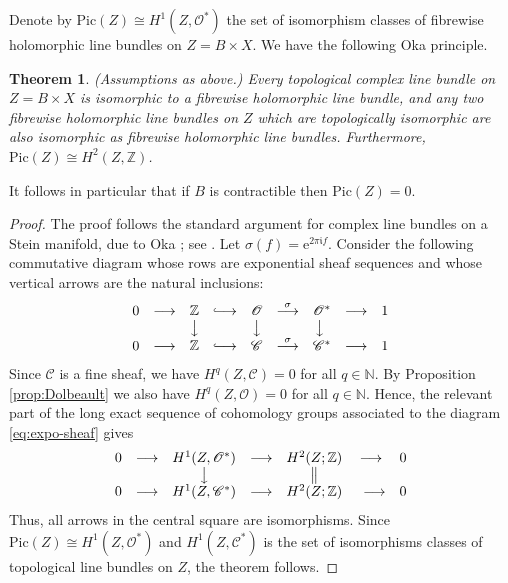 \documentclass[11pt]{amsart}
\numberwithin{equation}{section}
\newtheorem{theorem}{Theorem}[section]
\theoremstyle{definition}
\newcommand\Cscr{\mathscr{C}}
\newcommand\Oscr{\mathscr{O}}
\newcommand\N{\mathbb{N}}
\newcommand\Z{\mathbb{Z}}
\newcommand\igot{\mathfrak{i}}
\renewcommand\igot{\mathfrak{i}}
\newcommand\E{\mathrm{e}}
\newcommand\I{\imath}
\renewcommand\imath{\igot}
\newcommand\lra{\longrightarrow}
\newcommand\longhookrightarrow{\ensuremath{\lhook\joinrel\relbar\joinrel\rightarrow}}
\newcommand\Pic{\mathrm{Pic}}
\begin{document}
Denote by $\Pic(Z)\cong H^1(Z,\Oscr^*)$ the set of isomorphism 
classes of fibrewise holomorphic line bundles on $Z=B\times X$. 
We have the following Oka principle.

%
%
\begin{theorem}\label{th:OPLB}
(Assumptions as above.) 
Every topological complex line bundle on $Z=B\times X$ 
is isomorphic to a fibrewise holomorphic line bundle, 
and any two fibrewise holomorphic line bundles on $Z$
which are topologically isomorphic are also
isomorphic as fibrewise holomorphic line bundles.
Furthermore, $\Pic(Z)\cong H^2(Z,\Z)$.
\end{theorem} 

It follows in particular that if $B$ is contractible then $\Pic(Z)=0$.

\begin{proof}
The proof follows the standard argument for complex line
bundles on a Stein manifold, due to Oka 
\cite{Oka1939}; see \cite[Theorem 5.2.2]{Forstneric2017E}. 
Let $\sigma(f)= \E^{2\pi \I f}$. Consider the following
commutative diagram whose rows are 
exponential sheaf sequences and whose vertical arrows are 
the natural inclusions:
%
\begin{equation} \label{eq:expo-sheaf}
\begin{array}{*{9}c}
	0 & \lra & \Z  & \longhookrightarrow & \Oscr 
	& \stackrel{\sigma}{\lra} & \Oscr^*  & \lra & 1 \\
 	&    & \big\downarrow &  & \big\downarrow &                 
	& \!\!\big\downarrow & &  \\
	0 & \lra & \Z & \longhookrightarrow & \Cscr  & \stackrel{\sigma}{\lra} 
	& \Cscr^*  & \lra & 1 \\
\end{array}
\end{equation}
%
Since $\Cscr$ is a fine sheaf, we have  $H^q(Z,\Cscr)=0$ for all $q\in\N$.
By Proposition \ref{prop:Dolbeault} we also have $H^q(Z,\Oscr)=0$
for all $q\in\N$. Hence, the relevant part of 
the long exact sequence of cohomology groups associated 
to the diagram \eqref{eq:expo-sheaf} gives
\[ 
\begin{array}{*{8}c}
 	0  & \lra & H^1(Z,\Oscr^*) & \lra & H^2(Z;\Z) & \lra & 0 \\
        &  & \big\downarrow & & \big\Vert &  &    \\
        0   & \lra & H^1(Z,\Cscr^*) & \lra & H^2(Z;\Z) & \ \, \lra & 0 \\
\end{array}
\]
Thus, all arrows in the central square are isomorphisms. 
Since $\Pic(Z)\cong H^1(Z,\Oscr^*)$ and 
$H^1(Z,\Cscr^*)$ is the set of isomorphisms classes
of topological line bundles on $Z$, the theorem follows.
\end{proof}
\end{document}
